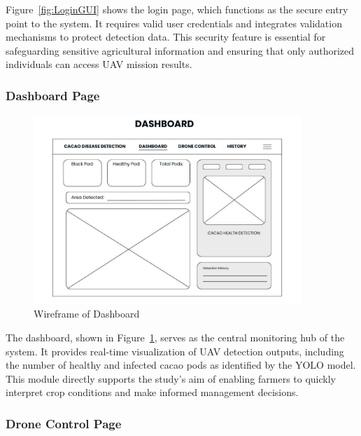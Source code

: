 Figure~\ref{fig:LoginGUI} shows the login page, which functions as the secure entry point to the system. It requires valid user credentials and integrates validation mechanisms to protect detection data. This security feature is essential for safeguarding sensitive agricultural information and ensuring that only authorized individuals can access UAV mission results.

\subsubsection*{Dashboard Page}

\begin{figure}[H]
	\centering
	\caption{Wireframe of Dashboard}
	\label{fig:DashboardGUI}
	\includegraphics[width=0.9\textwidth]{figures/Dashboard.pdf}
\end{figure}

The dashboard, shown in Figure~\ref{fig:DashboardGUI}, serves as the central monitoring hub of the system. It provides real-time visualization of UAV detection outputs, including the number of healthy and infected cacao pods as identified by the YOLO model. This module directly supports the study’s aim of enabling farmers to quickly interpret crop conditions and make informed management decisions.

\subsubsection*{Drone Control Page}

